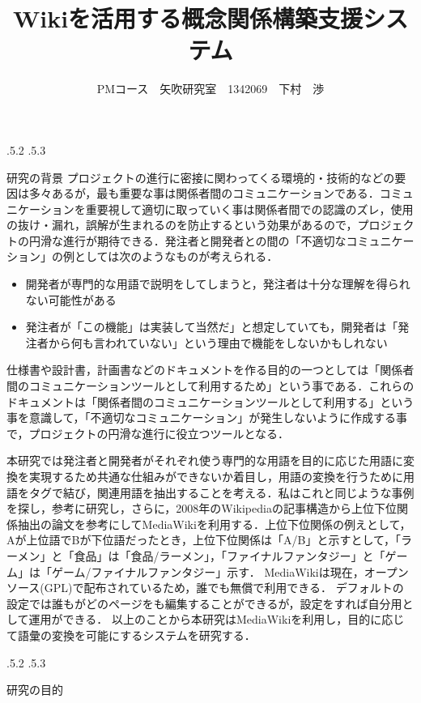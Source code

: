 \documentclass[uplatex]{jsarticle}
\title{\vspace{-14mm}Wikiを活用する概念関係構築支援システム}
\author{PMコース　矢吹研究室　1342069　下村　渉}
\date{}%
\makeatletter
\renewcommand{\section}{%
    \if@slide\clearpage\fi
    \@startsection{section}{1}{\z@}%
    {\Cvs \@plus.5\Cdp \@minus.2\Cdp}%
    {.5\Cvs \@plus.3\Cdp}%
    {\normalfont\raggedright}}
\makeatother
\begin{document}
\maketitle
\section{研究の背景}
プロジェクトの進行に密接に関わってくる環境的・技術的などの要因は多々あるが，最も重要な事は関係者間のコミュニケーションである．コミュニケーションを重要視して適切に取っていく事は関係者間での認識のズレ，使用の抜け・漏れ，誤解が生まれるのを防止するという効果があるので，プロジェクトの円滑な進行が期待できる．発注者と開発者との間の「不適切なコミュニケーション」の例としては次のようなものが考えられる．
\begin{itemize}
\item 開発者が専門的な用語で説明をしてしまうと，発注者は十分な理解を得られない可能性がある
\item 発注者が「この機能」は実装して当然だ」と想定していても，開発者は「発注者から何も言われていない」という理由で機能をしないかもしれない
\end{itemize}
仕様書や設計書，計画書などのドキュメントを作る目的の一つとしては「関係者間のコミュニケーションツールとして利用するため」という事である．これらのドキュメントは「関係者間のコミュニケーションツールとして利用する」という事を意識して，「不適切なコミュニケーション」が発生しないように作成する事で，プロジェクトの円滑な進行に役立つツールとなる\cite{a}．

本研究では発注者と開発者がそれぞれ使う専門的な用語を目的に応じた用語に変換を実現するため共通な仕組みができないか着目し，用語の変換を行うために用語をタグで結び，関連用語を抽出することを考える．私はこれと同じような事例を探し，参考に研究し，さらに，2008年のWikipediaの記事構造から上位下位関係抽出の論文を参考にしてMediaWikiを利用する\cite{b}．上位下位関係の例えとして，Aが上位語でBが下位語だったとき，上位下位関係は「A/B」と示すとして，「ラーメン」と「食品」は「食品/ラーメン」，「ファイナルファンタジー」と「ゲーム」は「ゲーム/ファイナルファンタジー」示す．
MediaWikiは現在，オープンソース(GPL)で配布されているため，誰でも無償で利用できる\cite{c}．
デフォルトの設定では誰もがどのページをも編集することができるが，設定をすれば自分用として運用ができる\cite{d}．
以上のことから本研究はMediaWikiを利用し，目的に応じて語彙の変換を可能にするシステムを研究する．





\section{研究の目的}
\end{document}
